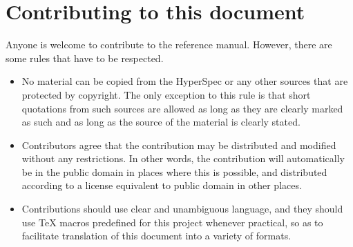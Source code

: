 \chapter{Contributing to this document}
\label{app-contributing}

Anyone is welcome to contribute to the \cl{} reference manual.
However, there are some rules that have to be respected.

\begin{itemize}
\item No material can be copied from the HyperSpec or any other
  sources that are protected by copyright.  The only exception to this
  rule is that short quotations from such sources are allowed as long
  as they are clearly marked as such and as long as the source of the
  material is clearly stated.
\item Contributors agree that the contribution may be distributed and
  modified without any restrictions.  In other words, the contribution
  will automatically be in the public domain in places where this is
  possible, and distributed according to a license equivalent to
  public domain in other places. 
\item Contributions should use clear and unambiguous language, and
  they should use TeX macros predefined for this project whenever
  practical, so as to facilitate translation of this document into a
  variety of formats. 
\end{itemize}
